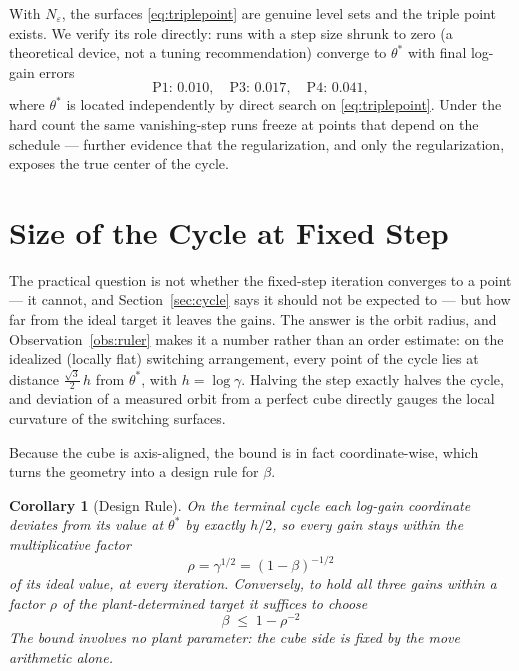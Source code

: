 \documentclass[letterpaper, 10pt, conference, twocolumn]{ieeeconf}
\newtheorem{corollary}{Corollary}
\newcommand{\Neps}{N_{\varepsilon}}
\begin{document}
With $\Neps$, the surfaces \eqref{eq:triplepoint} are genuine level sets and
the triple point exists. We verify its role directly: runs with a step size
shrunk to zero (a theoretical device, not a tuning recommendation) converge to
$\theta^*$ with final log-gain errors
\begin{equation*}
\text{P1: } 0.010, \quad \text{P3: } 0.017, \quad \text{P4: } 0.041,
\end{equation*}
where $\theta^*$ is located independently by direct search on
\eqref{eq:triplepoint}. Under the hard count the same vanishing-step runs
freeze at points that depend on the schedule --- further evidence that the
regularization, and only the regularization, exposes the true center of the
cycle.

\section{Size of the Cycle at Fixed Step}
\label{sec:size}

The practical question is not whether the fixed-step iteration converges to a
point --- it cannot, and Section~\ref{sec:cycle} says it should not be expected
to --- but how far from the ideal target it leaves the gains. The answer is
the orbit radius, and Observation~\ref{obs:ruler} makes it a number rather
than an order estimate: on the idealized (locally flat) switching
arrangement, every point of the cycle lies at distance
$\tfrac{\sqrt{3}}{2}\, h$ from $\theta^*$, with $h = \log\gamma$. Halving
the step exactly halves the cycle, and deviation of a measured orbit from a
perfect cube directly gauges the local curvature of the switching surfaces.

Because the cube is axis-aligned, the bound is in fact coordinate-wise, which
turns the geometry into a design rule for $\beta$.

\begin{corollary}[Design Rule]
\label{cor:design}
On the terminal cycle each log-gain coordinate deviates from its value at
$\theta^*$ by exactly $h/2$, so every gain stays within the multiplicative
factor
\begin{equation}
\rho = \gamma^{1/2} = (1-\beta)^{-1/2}
\label{eq:designfwd}
\end{equation}
of its ideal value, at every iteration. Conversely, to hold all three gains
within a factor $\rho$ of the plant-determined target it suffices to choose
\begin{equation}
\boxed{\;\beta \;\le\; 1 - \rho^{-2}\;}
\label{eq:designrule}
\end{equation}
The bound involves no plant parameter: the cube side is fixed by the move
arithmetic alone.
\end{corollary}
\end{document}
